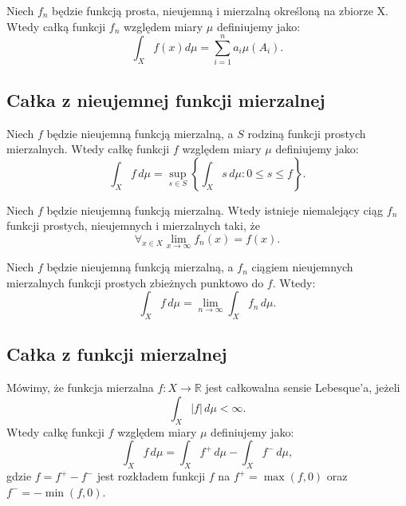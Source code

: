 	\begin{df}
		Niech $f_n$ będzie funkcją prosta, nieujemną i mierzalną określoną na zbiorze X. Wtedy całką funkcji $f_n$ względem miary $\mu$ definiujemy jako:				
		\begin{equation}
			 \int_X f(x) d \mu= \sum_{i=1}^n a_i \mu(A_i).
		\end{equation}
	\end{df}
	
	\subsection{Całka z nieujemnej funkcji mierzalnej}
	\begin{df}
		Niech $f$ będzie nieujemną funkcją mierzalną, a $S$ rodziną funkcji prostych mierzalnych. Wtedy całkę funkcji $f$ względem miary $\mu$ definiujemy jako:
		\begin{equation}
			\int_X f \, d\mu = \sup_{s \in S} \left\{ \int_X s \, d\mu: 0 \leq s \leq f \right\}.
		\end{equation}
	\end{df}

	\begin{tw}
		Niech $f$ będzie nieujemną funkcją mierzalną. Wtedy istnieje niemalejący ciąg $f_n$ funkcji prostych, nieujemnych i mierzalnych taki, że
		$$
		\forall_{x \in X} \lim_{x \rightarrow \infty} f_n(x) = f(x).
		$$
	\end{tw}
	
	\begin{tw}
		Niech $f$ będzie nieujemną funkcją mierzalną, a $f_n$ ciągiem nieujemnych mierzalnych funkcji prostych zbieżnych punktowo do $f$. Wtedy: 
		\begin{equation}
				\int_X f \, d\mu = \lim_{n \rightarrow \infty} \int_X f_n \, d\mu.
		\end{equation}
		
	\end{tw}
	\subsection{Całka z funkcji mierzalnej}
	\begin{df}
		Mówimy, że funkcja mierzalna $f:X \rightarrow \mathbb{R}$ jest całkowalna sensie Lebesque'a, jeżeli
		\begin{equation}
			\int_X |f| \, d \mu < \infty.
		\end{equation}
		Wtedy całkę funkcji $f$ względem miary $\mu$ definiujemy jako:
		\begin{equation}
			\int_X f \, d\mu = \int_X f^+ \, d\mu -  \int_X f^- \, d\mu, 
		\end{equation}
		gdzie $f = f^+ - f^-$ jest rozkładem funkcji $f$ na $f^+ = \max(f, 0)$ oraz $f^- = -\min(f, 0)$.
	\end{df}
	
